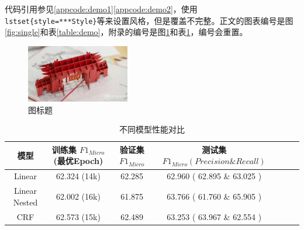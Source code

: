\documentclass[a4paper]{article}
\begin{document}
代码引用参见\ref{appcode:demo1}\ref{appcode:demo2}，使用\texttt{\\lstset\{style=***Style\}}等来设置风格，但是覆盖不完整。正文的图表编号是图\ref{fig:single}和表\ref{table:demo}，附录的编号是图\ref{appfig:single}和表\ref{apptable:result}，编号会重置。

\begin{figure}[!h]
	\centering
	\vspace{0cm}
	\includegraphics[width=0.4\textwidth,trim=50 100 200 75,clip]{figures/fig1.jpg}%
	\vspace{0cm}
	\caption{图标题}
	\label{appfig:single}
\end{figure}

\begin{table}[!h]
    \centering
    \begin{tabular}{ccccccc}
        \toprule
        模型 & 训练集 $F1_{Micro}$ (最优Epoch) & 验证集 $F1_{Micro}$ & 测试集 $F1_{Micro}(Precision\&Recall)$  \\
        \midrule
        Linear & 62.324 (14k) & 62.285 & 62.960 ( 62.895 \& 63.025 ) \\
        Linear Nested & 62.002 (16k) & 61.875 & 63.766 ( 61.760 \& 65.905 ) \\ 
        CRF & 62.573 (15k) & 62.489 & 63.253 ( 63.967 \& 62.554 ) \\
        \bottomrule
    \end{tabular}
    \caption{不同模型性能对比}
    \label{apptable:result}
\end{table}
\end{document}
